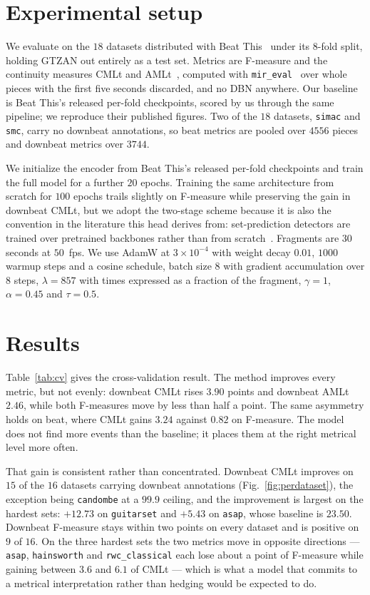 \section{Experimental setup}

We evaluate on the $18$ datasets distributed with Beat This~\cite{foscarin2024beat} under its $8$-fold split, holding GTZAN out entirely as a test set. Metrics are F-measure and the continuity measures CMLt and AMLt~\cite{davies2009evaluation}, computed with \texttt{mir\_eval}~\cite{raffel2014mir} over whole pieces with the first five seconds discarded, and no DBN anywhere. Our baseline is Beat This's released per-fold checkpoints, scored by us through the same pipeline; we reproduce their published figures. Two of the $18$ datasets, \texttt{simac} and \texttt{smc}, carry no downbeat annotations, so beat metrics are pooled over $4556$ pieces and downbeat metrics over $3744$.

We initialize the encoder from Beat This's released per-fold checkpoints and train the full model for a further $20$ epochs. Training the same architecture from scratch for $100$ epochs trails slightly on F-measure while preserving the gain in downbeat CMLt, but we adopt the two-stage scheme because it is also the convention in the literature this head derives from: set-prediction detectors are trained over pretrained backbones rather than from scratch~\cite{carion2020end}. Fragments are $30$ seconds at $50$~fps. We use AdamW at $3\times10^{-4}$ with weight decay $0.01$, $1000$ warmup steps and a cosine schedule, batch size $8$ with gradient accumulation over $8$ steps, $\lambda = 857$ with times expressed as a fraction of the fragment, $\gamma = 1$, $\alpha = 0.45$ and $\tau = 0.5$.

\section{Results}

Table~\ref{tab:cv} gives the cross-validation result. The method improves every metric, but not evenly: downbeat CMLt rises $3.90$ points and downbeat AMLt $2.46$, while both F-measures move by less than half a point. The same asymmetry holds on beat, where CMLt gains $3.24$ against $0.82$ on F-measure. The model does not find more events than the baseline; it places them at the right metrical level more often.

That gain is consistent rather than concentrated. Downbeat CMLt improves on $15$ of the $16$ datasets carrying downbeat annotations (Fig.~\ref{fig:perdataset}), the exception being \texttt{candombe} at a $99.9$ ceiling, and the improvement is largest on the hardest sets: $+12.73$ on \texttt{guitarset} and $+5.43$ on \texttt{asap}, whose baseline is $23.50$. Downbeat F-measure stays within two points on every dataset and is positive on $9$ of $16$. On the three hardest sets the two metrics move in opposite directions --- \texttt{asap}, \texttt{hainsworth} and \texttt{rwc\_classical} each lose about a point of F-measure while gaining between $3.6$ and $6.1$ of CMLt --- which is what a model that commits to a metrical interpretation rather than hedging would be expected to do.

